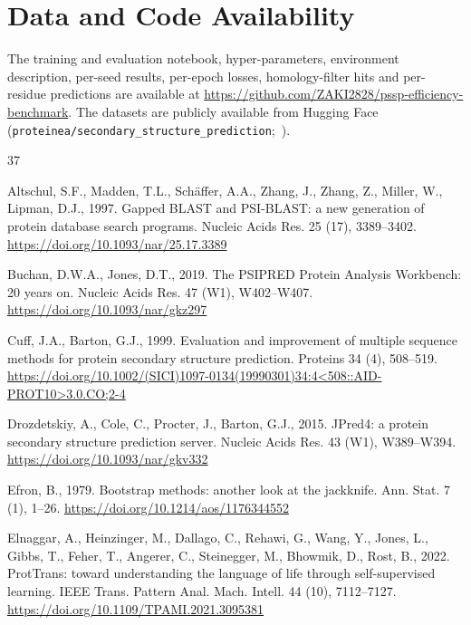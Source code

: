 \documentclass[preprint,12pt,authoryear]{elsarticle}
\begin{document}
\section*{Data and Code Availability}
The training and evaluation notebook, hyper-parameters, environment description, per-seed results, per-epoch losses, homology-filter hits and per-residue predictions are available at \url{https://github.com/ZAKI2828/pssp-efficiency-benchmark}. The datasets are publicly available from Hugging Face (\nolinkurl{proteinea/secondary_structure_prediction};~\citealp{proteinea2023dataset}).


\begin{thebibliography}{37}

Altschul, S.F., Madden, T.L., Sch{\"a}ffer, A.A., Zhang, J., Zhang, Z., Miller, W., Lipman, D.J., 1997. Gapped BLAST and PSI-BLAST: a new generation of protein database search programs. Nucleic Acids Res. 25 (17), 3389--3402. \url{https://doi.org/10.1093/nar/25.17.3389}

Buchan, D.W.A., Jones, D.T., 2019. The PSIPRED Protein Analysis Workbench: 20 years on. Nucleic Acids Res. 47 (W1), W402--W407. \url{https://doi.org/10.1093/nar/gkz297}

Cuff, J.A., Barton, G.J., 1999. Evaluation and improvement of multiple sequence methods for protein secondary structure prediction. Proteins 34 (4), 508--519. \url{https://doi.org/10.1002/(SICI)1097-0134(19990301)34:4<508::AID-PROT10>3.0.CO;2-4}

Drozdetskiy, A., Cole, C., Procter, J., Barton, G.J., 2015. JPred4: a protein secondary structure prediction server. Nucleic Acids Res. 43 (W1), W389--W394. \url{https://doi.org/10.1093/nar/gkv332}

Efron, B., 1979. Bootstrap methods: another look at the jackknife. Ann. Stat. 7 (1), 1--26. \url{https://doi.org/10.1214/aos/1176344552}

Elnaggar, A., Heinzinger, M., Dallago, C., Rehawi, G., Wang, Y., Jones, L., Gibbs, T., Feher, T., Angerer, C., Steinegger, M., Bhowmik, D., Rost, B., 2022. ProtTrans: toward understanding the language of life through self-supervised learning. IEEE Trans. Pattern Anal. Mach. Intell. 44 (10), 7112--7127. \url{https://doi.org/10.1109/TPAMI.2021.3095381}


\end{thebibliography}
\end{document}
